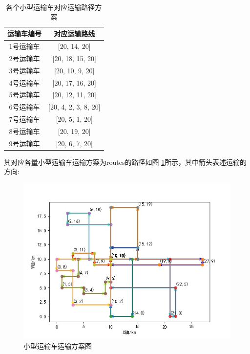 \documentclass{whutmod}
\begin{document}
  	\begin{table}[H]
  	\centering		\caption{各个小型运输车对应运输路径方案}\label{zhuansasgzai}
  	\begin{tabular}{cc}
  		\toprule[2pt]
  		\multicolumn{1}{m{5cm}}{\centering 运输车编号}
  		& \multicolumn{1}{m{5cm}}{\centering 对应运输路线}
  		\\
  		\midrule[1pt]
  		1号运输车 &  [20, 14, 20] \\ 
  		2号运输车 &  [20, 18, 15, 20] \\ 
  		3号运输车 &  [20, 10, 9, 20] \\ 
  		4号运输车 &  [20, 17, 16, 20] \\ 
  		5号运输车 &   [20, 12, 11, 20]\\ 
  		6号运输车 & [20, 4, 2, 3, 8, 20] \\ 
  		7号运输车 & [20, 5, 1, 20] \\ 
  		8号运输车 &  [20, 19, 20] \\ 
  		9号运输车 &   [20, 6, 7, 20] \\ 
  		\bottomrule[2pt]	
  	\end{tabular}
  \end{table}
  
  其对应各量小型运输车运输方案为routes的路径如图 \ref{ssssssss}所示，其中箭头表述运输的方向:
  
  \begin{figure}[H]
  	\centering
  	\includegraphics[width=\textwidth]{figures/22.jpg}
  	\caption{小型运输车运输方案图}\label{ssssssss}
  \end{figure}
  
\end{document}
